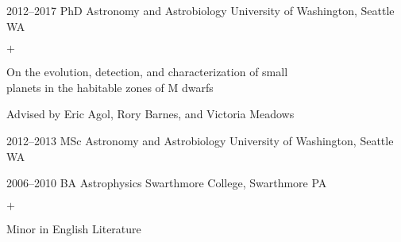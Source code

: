 \documentclass[]{luger-cv} %
\begin{document}
\begin{entrylist}


\entry
{2012--2017}
{PhD {\normalfont Astronomy and Astrobiology}}
{University of Washington, Seattle WA}
{%
\vspace{-1em}
\begin{list}{$+$}{\cvlist}
\item On the evolution, detection, and characterization of small \\ planets in the habitable zones of M dwarfs
\item Advised by Eric Agol, Rory Barnes, and Victoria Meadows
\end{list}
}


\entry
{2012--2013}
{MSc {\normalfont Astronomy and Astrobiology}}
{University of Washington, Seattle WA}


\entry
{2006--2010}
{BA {\normalfont Astrophysics}}
{Swarthmore College, Swarthmore PA}
{\vspace{-1em}
\begin{list}{$+$}{\cvlist}
\item Minor in English Literature
\end{list}}


\end{entrylist}



\end{document}
